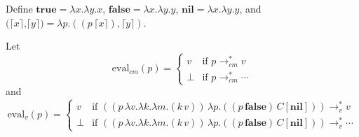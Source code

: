 \documentclass[ms,electronic,twosidetoc,letterpaper,chaptercenter,parttop]{byumsphd}
\begin{document}
Define $\textbf{true}=\lambda x.\lambda y.x$, $\textbf{false}=\lambda x.\lambda y.y$, $\textbf{nil}=\lambda x.\lambda y.y$, and $\textbf{(}\lceil x\rceil\textbf{,}\lceil y\rceil\textbf{)}=\lambda p.((p\,\lceil x\rceil),\lceil y\rceil)$.

Let
\[
\mathrm{eval}_{cm}(p)=\begin{cases}
v     &\text{if $p\rightarrow_{cm}^{*}v$}\\
\perp &\text{if $p\rightarrow_{cm}^{*}\cdots$}
\end{cases}
\]
and
\[
\mathrm{eval}_{v}(p)=\begin{cases}
v     &\text{if $((p\,\lambda v.\lambda k.\lambda m.(k\,v))\,\lambda p.((p\,\textbf{false})\,C[\textbf{nil}]))\rightarrow_{v}^{*}v$}\\
\perp &\text{if $((p\,\lambda v.\lambda k.\lambda m.(k\,v))\,\lambda p.((p\,\textbf{false})\,C[\textbf{nil}]))\rightarrow_{v}^{*}\cdots$}
\end{cases}
\]





\newtheorem{theorem}{Theorem}
\newtheorem{case}{Case}
\end{document}
